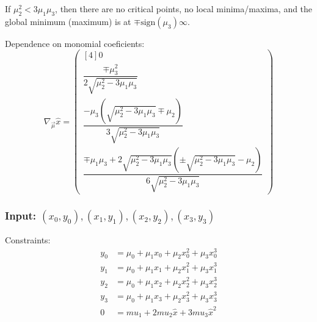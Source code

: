 If $\mu_2^{2} < 3 \mu_1 \mu_3$, then there are no critical points,
no local minima/maxima, and the global minimum (maximum) is at
$\mp\text{sign}(\mu_3)\infty$.

Dependence on monomial coeficients:
\begin{equation}
\nabla_{\vec{\mu}} \hat{x} =
\begin{pmatrix}[4]
0 
\\
\dfrac{
\mp \mu_3^{2}
}{
2 \sqrt{\mu_2^{2} -3 \mu_1 \mu_3}
}
\\
\dfrac{
-\mu_3 \left(\sqrt{\mu_2^{2} -3 \mu_1 \mu_3} \mp \mu_2\right)
}{
3 \sqrt{\mu_2^{2} -3 \mu_1 \mu_3}
}
\\
\dfrac{
\mp \mu_1 \mu_3
+ 2 \sqrt{\mu_2^{2} - 3 \mu_1 \mu_3}
\left(\pm \sqrt{\mu_2^{2} - 3 \mu_1 \mu_3}  - \mu_2 \right)
}{
6 \sqrt{\mu_2^{2} -3 \mu_1 \mu_3}
}
\end{pmatrix}
\end{equation}

\subsubsection{Input: $(x_0,y_0),(x_1,y_1),(x_2,y_2),(x_3,y_3)$}
\label{sec:monomial-yyyy}

Constraints:
\begin{align}
y_0 & = \mu_0 + \mu_1 x_0 + \mu_2 x_0^2 + \mu_3 x_0^3
\\
y_1 & = \mu_0 + \mu_1 x_1 + \mu_2 x_1^2 + \mu_3 x_1^3
\nonumber
\\
y_2 & = \mu_0 + \mu_1 x_2 + \mu_2 x_2^2 + \mu_3 x_2^3
\\
y_3 & = \mu_0 + \mu_1 x_3 + \mu_2 x_3^2 + \mu_3 x_3^3
\nonumber
\\
0 & =  mu_1 + 2 mu_2 \hat{x} + 3 mu_3 \hat{x}^2
\nonumber
\end{align}

